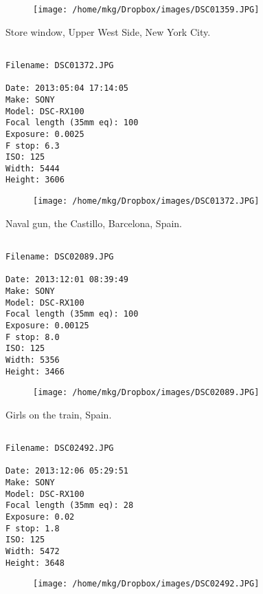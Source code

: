 \begin{figure}
\texttt{[image: /home/mkg/Dropbox/images/DSC01359.JPG]}
\end{figure}
    
\clearpage
\onecolumn
\noindent Store window, Upper West Side, New York City.
\noindent
\begin{lstlisting}

Filename: DSC01372.JPG

Date: 2013:05:04 17:14:05
Make: SONY
Model: DSC-RX100
Focal length (35mm eq): 100
Exposure: 0.0025
F stop: 6.3
ISO: 125
Width: 5444
Height: 3606
\end{lstlisting}
\clearpage

\begin{figure}
\texttt{[image: /home/mkg/Dropbox/images/DSC01372.JPG]}
\end{figure}
    
\clearpage
\onecolumn
\noindent Naval gun, the Castillo, Barcelona, Spain.
\noindent
\begin{lstlisting}

Filename: DSC02089.JPG

Date: 2013:12:01 08:39:49
Make: SONY
Model: DSC-RX100
Focal length (35mm eq): 100
Exposure: 0.00125
F stop: 8.0
ISO: 125
Width: 5356
Height: 3466
\end{lstlisting}
\clearpage

\begin{figure}
\texttt{[image: /home/mkg/Dropbox/images/DSC02089.JPG]}
\end{figure}
    
\clearpage
\onecolumn
\noindent Girls on the train, Spain.
\noindent
\begin{lstlisting}

Filename: DSC02492.JPG

Date: 2013:12:06 05:29:51
Make: SONY
Model: DSC-RX100
Focal length (35mm eq): 28
Exposure: 0.02
F stop: 1.8
ISO: 125
Width: 5472
Height: 3648
\end{lstlisting}
\clearpage

\begin{figure}
\texttt{[image: /home/mkg/Dropbox/images/DSC02492.JPG]}
\end{figure}
    
